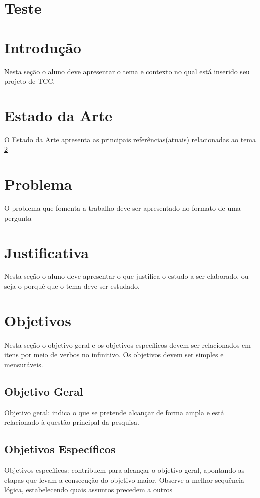 \documentclass[a4paper,12pt]{article}
\begin{document}


\newpage
\tableofcontents

\newpage
\section{Teste}
\section{Introdução}

\label{sc:introducao}
Nesta seção o aluno deve apresentar o tema e contexto no qual está inserido seu projeto de TCC.


\section{Estado da Arte}
O Estado da Arte apresenta as principais referências(atuais) relacionadas ao tema
\ref{sc:introducao}

\section{Problema}
\label{sc:problema}
O problema que fomenta a trabalho deve ser apresentado no formato de uma pergunta


\section{Justificativa}
Nesta seção o aluno deve apresentar o que justifica o estudo a ser elaborado, ou seja o porquê que o tema deve ser estudado.

\section{Objetivos}
\label{sc:objetivos}
Nesta seção o objetivo geral e os objetivos específicos devem ser relacionados em itens por meio de verbos no infinitivo. Os objetivos devem ser simples e mensuráveis.

\subsection{Objetivo Geral}
Objetivo geral: indica o que se pretende alcançar de forma ampla e está relacionado à questão principal da pesquisa.

\subsection{Objetivos Específicos}
Objetivos específicos: contribuem para alcançar o objetivo geral, apontando as etapas que levam a consecução do objetivo maior. Observe a melhor sequência lógica, estabelecendo quais assuntos precedem a outros
\end{document}
